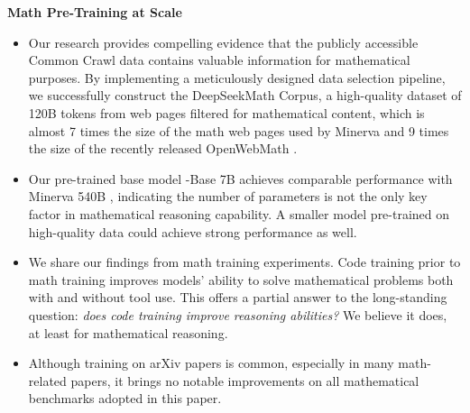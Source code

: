 \noindent
\textbf{Math Pre-Training at Scale}
\begin{itemize}[topsep=0pt]
    \item Our research provides compelling evidence that the publicly accessible Common Crawl data contains valuable information for mathematical purposes.
    By implementing a meticulously designed data selection pipeline, we successfully construct the DeepSeekMath Corpus, a high-quality dataset of 120B tokens from web pages filtered for mathematical content, which is almost 7 times the size of the math web pages used by Minerva \citep{minerva} and 9 times the size of the recently released OpenWebMath \citep{openwebmath}.

    \item Our pre-trained base model \spmath-Base 7B achieves comparable performance with Minerva 540B \citep{minerva}, indicating the number of parameters is not the only key factor in mathematical reasoning capability.
    A smaller model pre-trained on high-quality data could achieve strong performance as well. 

    \item We share our findings from math training experiments.
    Code training prior to math training improves models' ability to solve mathematical problems both with and without tool use.
    This offers a partial answer to the long-standing question: \textit{does code training improve reasoning abilities?}
    We believe it does, at least for mathematical reasoning.

    \item Although training on arXiv papers is common, especially in many math-related papers, it brings no notable improvements on all mathematical benchmarks adopted in this paper.
\end{itemize}

